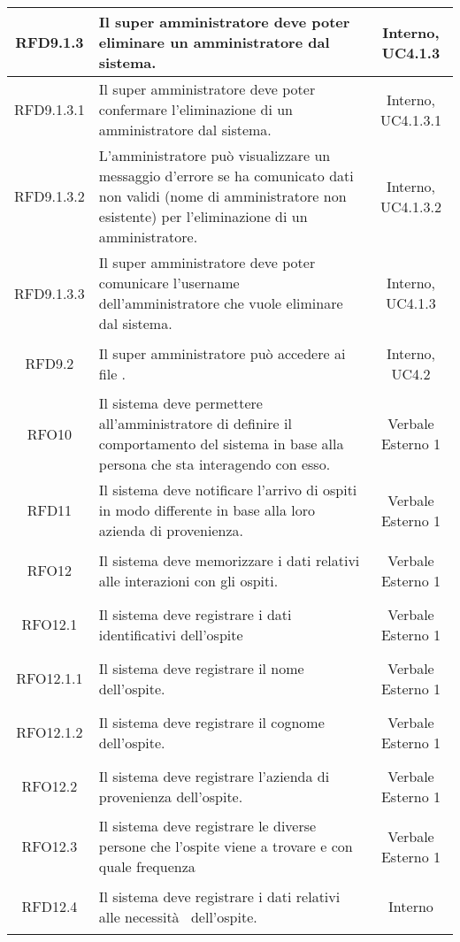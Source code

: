 \begin{longtable}{|c|>{\centering}m{7cm}|c|}
	\hypertarget{RFD9.1.3}{RFD9.1.3} & Il super amministratore deve poter eliminare un amministratore dal sistema. & Interno, UC4.1.3\\ \hline
	\hypertarget{RFD9.1.3.1}{RFD9.1.3.1} & Il super amministratore deve poter confermare l'eliminazione di un amministratore dal sistema. & Interno, UC4.1.3.1\\ \hline
	\hypertarget{RFD9.1.3.2}{RFD9.1.3.2} & L'amministratore può visualizzare un messaggio d'errore se ha comunicato dati non validi (nome di amministratore non esistente) per l'eliminazione di un amministratore. & Interno, UC4.1.3.2\\ \hline
	\hypertarget{RFD9.1.3.3}{RFD9.1.3.3} & Il super amministratore deve poter comunicare l'username dell'amministratore che vuole eliminare dal sistema. & Interno, UC4.1.3\\ \hline
	\hypertarget{RFD9.2}{RFD9.2} & Il super amministratore può accedere ai file \gl{log}. & Interno, UC4.2\\ \hline
	\hypertarget{RFO10}{RFO10} & Il sistema deve permettere all'amministratore di definire il comportamento del sistema in base alla persona che sta interagendo con esso. & Verbale Esterno 1\\ \hline
	\hypertarget{RFD11}{RFD11} & Il sistema deve notificare l'arrivo di ospiti in modo differente in base alla loro azienda di provenienza. & Verbale Esterno 1\\ \hline
	\hypertarget{RFO12}{RFO12} & Il sistema deve memorizzare i dati relativi alle interazioni con gli ospiti. & Verbale Esterno 1\\ \hline
	\hypertarget{RFO12.1}{RFO12.1} & Il sistema deve registrare i dati identificativi dell'ospite & Verbale Esterno 1\\ \hline
	\hypertarget{RFO12.1.1}{RFO12.1.1} & Il sistema deve registrare il nome dell'ospite. & Verbale Esterno 1\\ \hline
	\hypertarget{RFO12.1.2}{RFO12.1.2} & Il sistema deve registrare il cognome dell'ospite. & Verbale Esterno 1\\ \hline
	\hypertarget{RFO12.2}{RFO12.2} & Il sistema deve registrare l'azienda di provenienza dell'ospite. & Verbale Esterno 1\\ \hline
	\hypertarget{RFO12.3}{RFO12.3} & Il sistema deve registrare le diverse persone che l'ospite viene a trovare e con quale frequenza & Verbale Esterno 1\\ \hline
	\hypertarget{RFD12.4}{RFD12.4} & Il sistema deve registrare i dati relativi alle necessità  dell'ospite. & Interno\\ \hline

\end{longtable}
